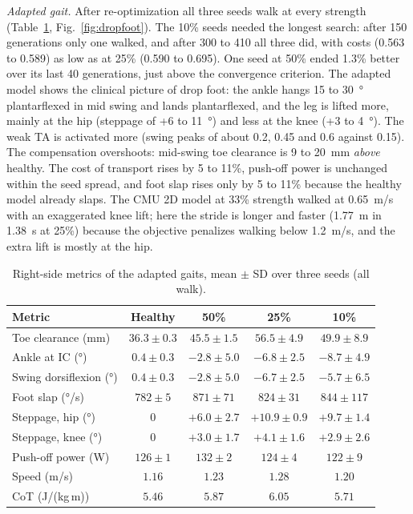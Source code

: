 \emph{Adapted gait.} After re-optimization all three seeds walk at every strength (Table~\ref{tab:dropfoot}, Fig.~\ref{fig:dropfoot}). The 10\% seeds needed the longest search: after 150 generations only one walked, and after 300 to 410 all three did, with costs (0.563 to 0.589) as low as at 25\% (0.590 to 0.695). One seed at 50\% ended 1.3\% better over its last 40 generations, just above the convergence criterion. The adapted model shows the clinical picture of drop foot: the ankle hangs 15 to \SI{30}{\degree} plantarflexed in mid swing and lands plantarflexed, and the leg is lifted more, mainly at the hip (steppage of +6 to \SI{+11}{\degree}) and less at the knee (+3 to \SI{+4}{\degree}). The weak TA is activated more (swing peaks of about 0.2, 0.45 and 0.6 against 0.15). The compensation overshoots: mid-swing toe clearance is 9 to 20~mm \emph{above} healthy. The cost of transport rises by 5 to 11\%, push-off power is unchanged within the seed spread, and foot slap rises only by 5 to 11\% because the healthy model already slaps. The CMU 2D model at 33\% strength \cite{dermksian} walked at \SI{0.65}{m/s} with an exaggerated knee lift; here the stride is longer and faster (\SI{1.77}{m} in \SI{1.38}{s} at 25\%) because the objective penalizes walking below \SI{1.2}{m/s}, and the extra lift is mostly at the hip.

\begin{table}[t]
\centering
\caption{Right-side metrics of the adapted gaits, mean $\pm$ SD over three seeds (all walk).}
\label{tab:dropfoot}
\footnotesize
\setlength{\tabcolsep}{3pt}
\begin{tabular}{lcccc}
\toprule
Metric & Healthy & 50\% & 25\% & 10\% \\
\midrule
Toe clearance (mm) & $36.3 \pm 0.3$ & $45.5 \pm 1.5$ & $56.5 \pm 4.9$ & $49.9 \pm 8.9$ \\
Ankle at IC (\si{\degree}) & $0.4 \pm 0.3$ & $-2.8 \pm 5.0$ & $-6.8 \pm 2.5$ & $-8.7 \pm 4.9$ \\
Swing dorsiflexion (\si{\degree}) & $0.4 \pm 0.3$ & $-2.8 \pm 5.0$ & $-6.7 \pm 2.5$ & $-5.7 \pm 6.5$ \\
Foot slap (\si{\degree/s}) & $782 \pm 5$ & $871 \pm 71$ & $824 \pm 31$ & $844 \pm 117$ \\
Steppage, hip (\si{\degree}) & 0 & $+6.0 \pm 2.7$ & $+10.9 \pm 0.9$ & $+9.7 \pm 1.4$ \\
Steppage, knee (\si{\degree}) & 0 & $+3.0 \pm 1.7$ & $+4.1 \pm 1.6$ & $+2.9 \pm 2.6$ \\
Push-off power (W) & $126 \pm 1$ & $132 \pm 2$ & $124 \pm 4$ & $122 \pm 9$ \\
Speed (m/s) & $1.16$ & $1.23$ & $1.28$ & $1.20$ \\
CoT (J/(kg\,m)) & $5.46$ & $5.87$ & $6.05$ & $5.71$ \\
\bottomrule
\end{tabular}
\end{table}

